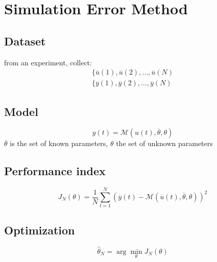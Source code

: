\documentclass{article}
\begin{document}
\section{Simulation Error Method}
\begin{center}
\end{center}
\subsection{Dataset} from an experiment, collect:
\begin{align*}
\{\overline{u}(1),\overline{u}(2),\dots,\overline{u}(N)\\
\{\overline{y}(1),\overline{y}(2),\dots,\overline{y}(N)
\end{align*}
\subsection{Model}
\[
y(t)=\mathcal{M}(u(t),\overline{\theta},\theta)
\]
$\overline{\theta}$ is the set of known parameters, $\theta$ the set of unknown parameters
\subsection{Performance index}
\[
J_N(\theta)=\frac{1}{N}
\sum_{t=1}^N
\left(
\overline{y}(t)
-
\mathcal{M}(\overline{u}(t),\overline{\theta},\theta)
\right)^2
\]
\subsection{Optimization}
\[
\hat{\theta}_N=\arg\min_\theta J_N(\theta)
\]
\end{document}
